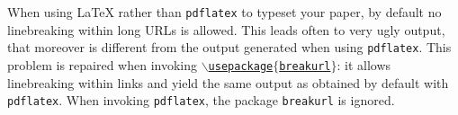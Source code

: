 \documentclass[submission,copyright,creativecommons]{eptcs}
\begin{document}
When using {\LaTeX} rather than {\tt pdflatex} to typeset your paper, by
default no linebreaking within long URLs is allowed. This leads often
to very ugly output, that moreover is different from the output
generated when using {\tt pdflatex}. This problem is repaired when
invoking \href{http://www.cse.unsw.edu.au/~rvg/EPTCS/breakurl.sty}
{\tt $\backslash$usepackage$\{$breakurl$\}$}: it allows linebreaking
within links and yield the same output as obtained by default with
{\tt pdflatex}. 
When invoking {\tt pdflatex}, the package {\tt breakurl} is ignored.

\nocite{*}


\end{document}
